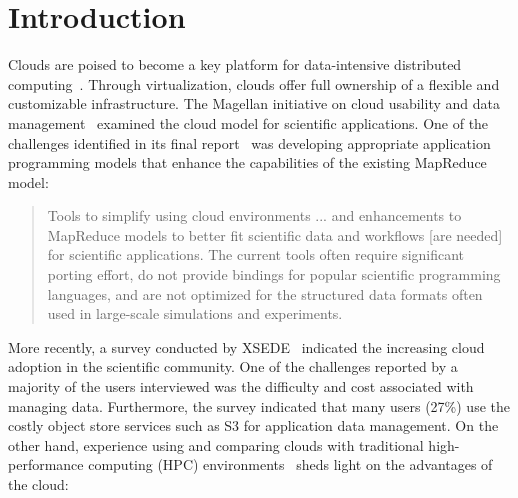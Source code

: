 \documentclass[10pt,journal,cspaper,compsoc]{IEEEtran}
\begin{document}
\IEEEpeerreviewmaketitle

\section{Introduction}

Clouds are poised to become a key platform for data-intensive distributed 
computing~\cite{cloudreq}. Through virtualization, clouds offer full ownership
of a flexible and customizable infrastructure. The Magellan
initiative on cloud usability and data management~\cite{magellan1} examined the
cloud model for scientific applications. One of the challenges identified in
its final report~\cite{magellan2} was developing appropriate application
programming models that enhance the capabilities of the existing MapReduce
model:

\begin{quote}
Tools to simplify using cloud environments ... and enhancements to
MapReduce models to better fit scientific data and workflows [are needed] for
scientific applications. The current tools often require significant porting
effort, do not provide bindings for popular scientific programming languages,
and are not optimized for the structured data formats often used in large-scale
simulations and experiments. 
\end{quote}

More recently, a survey conducted by XSEDE~\cite{xsede:cloudsurvey} indicated
the increasing cloud adoption in the scientific community. One of the
challenges reported by a majority of the users interviewed was the difficulty
and cost associated with managing data. Furthermore, the survey indicated that
many users (27\%) use the costly object store services such as S3 for
application data management. On the other hand, experience using and comparing
clouds with traditional high-performance computing (HPC)
environments~\cite{marathe, cloudvcluster} sheds light on the advantages of the
cloud:
\end{document}
